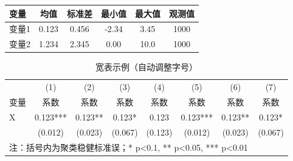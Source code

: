 
\begin{center}
\small
\begin{tabular}{lccccc}
\toprule
变量 & 均值 & 标准差 & 最小值 & 最大值 & 观测值 \\
\midrule
变量1 & 0.123 & 0.456 & -2.34 & 3.45 & 1000 \\
变量2 & 1.234 & 2.345 & 0.00 & 10.0 & 1000 \\
\bottomrule
\end{tabular}
\label{tab:descriptive}
\end{center}

\begin{table}[htbp]
\centering
\caption{回归结果表}
\footnotesize

\label{tab:baseline}
\end{table}

\begin{table}[htbp]
\centering
\caption{宽表示例（自动调整字号）}
\scriptsize  %
\setlength{\tabcolsep}{4pt}  %
\begin{tabular}{lccccccc}
\toprule
 & (1) & (2) & (3) & (4) & (5) & (6) & (7) \\
变量 & 系数 & 系数 & 系数 & 系数 & 系数 & 系数 & 系数 \\
\midrule
X & 0.123*** & 0.123** & 0.123* & 0.123 & 0.123*** & 0.123** & 0.123* \\
  & (0.012) & (0.023) & (0.067) & (0.123) & (0.012) & (0.023) & (0.067) \\
\bottomrule
\multicolumn{8}{l}{\footnotesize 注：括号内为聚类稳健标准误；* p<0.1, ** p<0.05, *** p<0.01}
\end{tabular}
\label{tab:wide_table}
\end{table}

%
